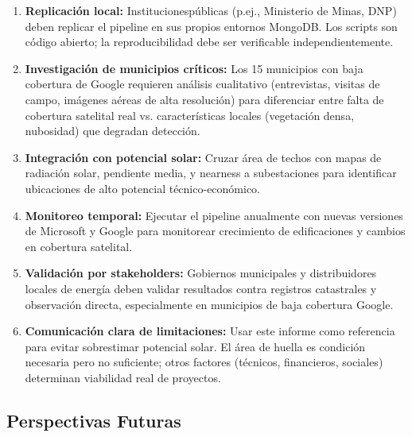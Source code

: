\documentclass[11pt, a4paper]{article}
\begin{document}
\begin{enumerate}
    \item \textbf{Replicación local:} Institucionespúblicas (p.ej., Ministerio de Minas, DNP) deben replicar el pipeline en sus propios entornos MongoDB. Los scripts son código abierto; la reproducibilidad debe ser verificable independientemente.

    \item \textbf{Investigación de municipios críticos:} Los 15 municipios con baja cobertura de Google requieren análisis cualitativo (entrevistas, visitas de campo, imágenes aéreas de alta resolución) para diferenciar entre falta de cobertura satelital real vs. características locales (vegetación densa, nubosidad) que degradan detección.

    \item \textbf{Integración con potencial solar:} Cruzar área de techos con mapas de radiación solar, pendiente media, y nearness a subestaciones para identificar ubicaciones de alto potencial técnico-económico.

    \item \textbf{Monitoreo temporal:} Ejecutar el pipeline anualmente con nuevas versiones de Microsoft y Google para monitorear crecimiento de edificaciones y cambios en cobertura satelital.

    \item \textbf{Validación por stakeholders:} Gobiernos municipales y distribuidores locales de energía deben validar resultados contra registros catastrales y observación directa, especialmente en municipios de baja cobertura Google.

    \item \textbf{Comunicación clara de limitaciones:} Usar este informe como referencia para evitar sobrestimar potencial solar. El área de huella es condición necesaria pero no suficiente; otros factores (técnicos, financieros, sociales) determinan viabilidad real de proyectos.
\end{enumerate}

\subsection{Perspectivas Futuras}
\end{document}
